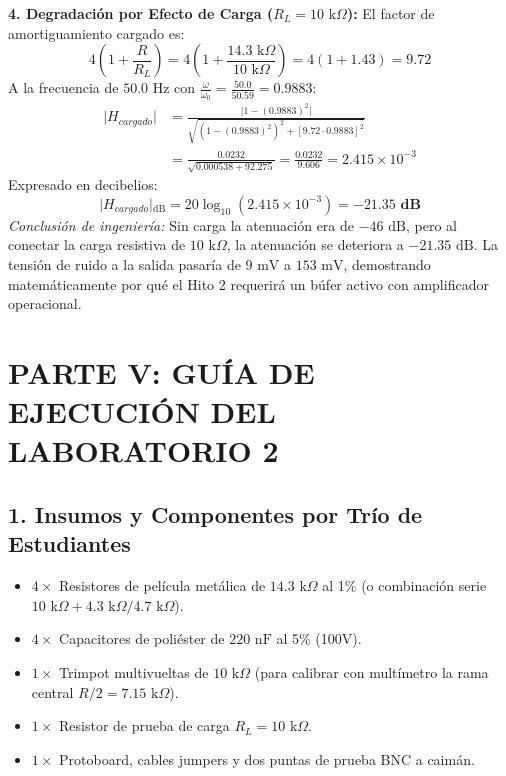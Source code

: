 \documentclass[11pt,a4paper,twoside]{article}
\begin{document}
\vspace{0.3cm}
\textbf{4. Degradación por Efecto de Carga ($R_L = 10\text{ k}\Omega$):}
El factor de amortiguamiento cargado es:
\begin{equation*}
    4 \left(1 + \frac{R}{R_L}\right) = 4 \left(1 + \frac{14.3\text{ k}\Omega}{10\text{ k}\Omega}\right) = 4 (1 + 1.43) = 9.72
\end{equation*}
A la frecuencia de $50.0\text{ Hz}$ con $\frac{\omega}{\omega_0} = \frac{50.0}{50.59} = 0.9883$:
\begin{align*}
    \vert{}H_{cargado}\vert{} &= \frac{\vert{}1 - (0.9883)^2\vert{}}{\sqrt{(1 - (0.9883)^2)^2 + [9.72 \cdot 0.9883]^2}} \\
    &= \frac{0.0232}{\sqrt{0.000538 + 92.275}} = \frac{0.0232}{9.606} = 2.415 \times 10^{-3}
\end{align*}
Expresado en decibelios:
\begin{equation*}
    \vert{}H_{cargado}\vert{}_{\text{dB}} = 20 \log_{10}(2.415 \times 10^{-3}) = \mathbf{-21.35\text{ dB}}
\end{equation*}
\textit{Conclusión de ingeniería:} Sin carga la atenuación era de $-46\text{ dB}$, pero al conectar la carga resistiva de $10\text{ k}\Omega$, la atenuación se deteriora a $-21.35\text{ dB}$. La tensión de ruido a la salida pasaría de $9\text{ mV}$ a $153\text{ mV}$, demostrando matemáticamente por qué el Hito 2 requerirá un búfer activo con amplificador operacional.

\newpage
\section{PARTE V: GUÍA DE EJECUCIÓN DEL LABORATORIO 2}
\subsection*{1. Insumos y Componentes por Trío de Estudiantes}
\begin{itemize}[itemsep=1pt]
    \item $4 \times$ Resistores de película metálica de $14.3\text{ k}\Omega$ al 1\% (o combinación serie $10\text{ k}\Omega + 4.3\text{ k}\Omega / 4.7\text{ k}\Omega$).
    \item $4 \times$ Capacitores de poliéster de $220\text{ nF}$ al 5\% (100V).
    \item $1 \times$ Trimpot multivueltas de $10\text{ k}\Omega$ (para calibrar con multímetro la rama central $R/2 = 7.15\text{ k}\Omega$).
    \item $1 \times$ Resistor de prueba de carga $R_L = 10\text{ k}\Omega$.
    \item $1 \times$ Protoboard, cables jumpers y dos puntas de prueba BNC a caimán.
\end{itemize}
\end{document}
